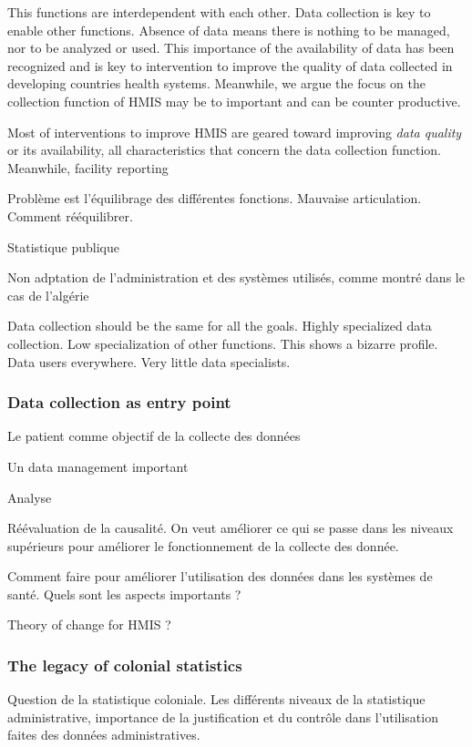 \documentclass[a4paper,11pt,final,twoside]{article}
\begin{document}
This functions are interdependent with each other. Data collection is key to enable other functions. Absence of data means there is nothing to be managed, nor to be analyzed or used. This importance of the availability of data has been recognized and is key to intervention to improve the quality of data collected in developing countries health systems. Meanwhile, we argue the focus on the collection function of HMIS may be to important and can be counter productive.

Most of interventions to improve HMIS are geared toward improving \textit{data quality} or its availability, all characteristics that concern the data collection function. Meanwhile, facility reporting 

Problème est l'équilibrage des différentes fonctions. Mauvaise articulation. Comment rééquilibrer.

Statistique publique

Non adptation de l'administration et des systèmes utilisés, comme montré dans le cas de l'algérie

Data collection should be the same for all the goals. Highly specialized data collection. Low specialization of other functions. This shows a bizarre profile. Data users everywhere. Very little data specialists.


\subsubsection{Data collection as entry point}
Le patient comme objectif de la collecte des données

Un data management important

Analyse

Réévaluation de la causalité. On veut améliorer ce qui se passe dans les niveaux supérieurs  pour améliorer le fonctionnement de la collecte des donnée. 

Comment faire pour améliorer l'utilisation des données dans les systèmes de santé. Quels sont les aspects importants ?

Theory of change for HMIS ?

\subsubsection{The legacy of colonial statistics}

Question de la statistique coloniale. Les différents niveaux de la statistique administrative, importance de la justification et du contrôle dans l'utilisation faites des données administratives.
\end{document}
